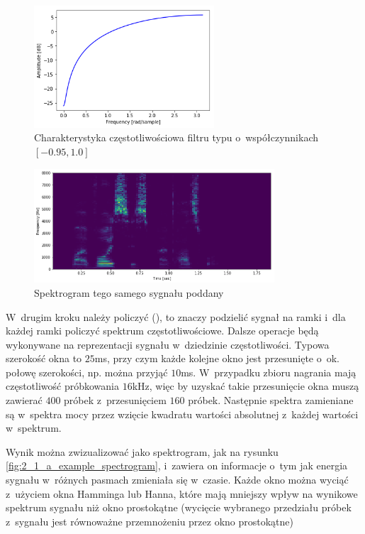 \begin{figure}[H]
    \centering
    \includegraphics[width=0.6\textwidth]{images/2_1_c_preemphasis_response}
    \caption{Charakterystyka częstotliwościowa filtru typu  o~współczynnikach $[-0.95, 1.0]$}
    \label{fig:2_1_c_preemphasis_response}
\end{figure}

\begin{figure}[H]
    \centering
    \includegraphics[width=0.8\textwidth]{images/2_1_b_example_preemphasis}
    \caption{Spektrogram tego samego sygnału poddany }
    \label{fig:2_1_b_example_preemphasis}
\end{figure}

W~drugim kroku należy policzyć  (), to znaczy podzielić
sygnał na ramki i~dla każdej ramki policzyć spektrum częstotliwościowe. Dalsze operacje
będą wykonywane na reprezentacji sygnału w~dziedzinie częstotliwości. Typowa szerokość
okna to $25$ms, przy czym każde kolejne okno jest przesunięte o~ok. połowę szerokości,
np. można przyjąć $10$ms. W~przypadku zbioru  nagrania mają częstotliwość próbkowania $16$kHz,
więc by uzyskać takie przesunięcie okna muszą zawierać $400$ próbek z~przesunięciem $160$ próbek.
Następnie spektra zamieniane są w~spektra mocy przez wzięcie kwadratu wartości absolutnej
z~każdej wartości w~spektrum.

Wynik  można zwizualizować jako spektrogram, jak na rysunku \ref{fig:2_1_a_example_spectrogram},
i~zawiera on informacje o~tym jak energia sygnału w~różnych pasmach zmieniała się w~czasie.
Każde okno można wyciąć z~użyciem okna Hamminga lub Hanna, które mają mniejszy wpływ
na wynikowe spektrum sygnału niż okno prostokątne (wycięcie wybranego przedziału próbek
z~sygnału jest równoważne przemnożeniu przez okno prostokątne)

